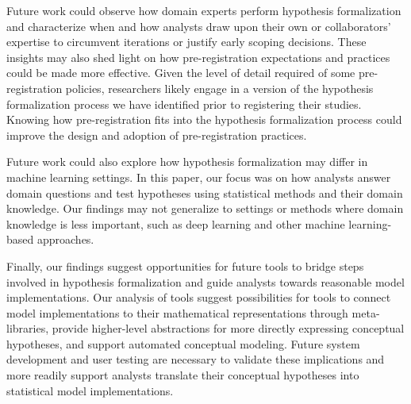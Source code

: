 Future work could observe how domain experts perform hypothesis formalization
and characterize when and how analysts draw upon their own or collaborators'
expertise to circumvent iterations or justify early scoping decisions. These insights may also shed light on how pre-registration expectations and
practices could be made more effective. Given the level of detail required of
some pre-registration policies, researchers likely engage in a version of the
hypothesis formalization process we have identified prior to registering their
studies. Knowing how pre-registration fits into the hypothesis formalization
process could improve the design and adoption of pre-registration practices.

Future work could also explore how hypothesis formalization may differ in
machine learning settings. In this paper, our focus was on how analysts answer
domain questions and test hypotheses using statistical methods and their domain
knowledge. Our findings may not generalize to settings or methods where domain
knowledge is less important, such as deep learning and other machine
learning-based approaches. 


Finally, our findings suggest opportunities for future tools to bridge steps
involved in hypothesis formalization and guide analysts towards reasonable model
implementations. Our analysis of tools suggest possibilities for tools to
connect model implementations to their mathematical representations through
meta-libraries, provide higher-level abstractions for more directly expressing
conceptual hypotheses, and support automated conceptual modeling. Future system
development and user testing are necessary to validate these implications and
more readily support analysts translate their conceptual hypotheses into
statistical model implementations.





